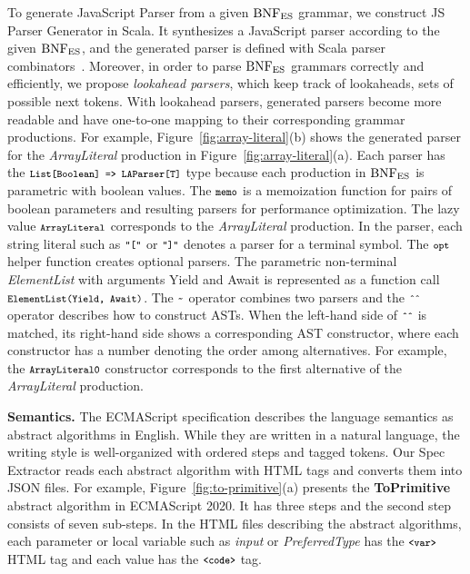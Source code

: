 To generate {\sf JavaScript Parser} from a given \( \text{BNF}_{\text{ES}} \) grammar, we
construct \textsf{JS Parser Generator} in Scala.  It synthesizes a
JavaScript parser according to the given \( \text{BNF}_{\text{ES}} \), and the
generated parser is defined with Scala parser combinators~\cite{scala-parser-combinators}.
Moreover, in order to parse \( \text{BNF}_{\text{ES}} \) grammars correctly and
efficiently, we propose \textit{lookahead parsers}, which keep track
of lookaheads, sets of possible next tokens.  With lookahead parsers,
generated parsers become more readable and have one-to-one
mapping to their corresponding grammar productions.
For example, Figure~\ref{fig:array-literal}(b) shows the generated
parser for the \textit{ArrayLiteral} production in Figure~\ref{fig:array-literal}(a).
Each parser has the \( \texttt{\footnotesize List[Boolean] => LAParser[T]} \) type
because  each production in \( \text{BNF}_{\text{ES}} \) is parametric with boolean values.
The \( \texttt{\footnotesize memo} \) is a memoization function for pairs of boolean
parameters and resulting parsers for performance optimization.
The lazy value \( \texttt{\footnotesize ArrayLiteral} \) corresponds to the
\textit{ArrayLiteral} production.  In the parser, each string literal
such as \( \texttt{\footnotesize"["} \) or \( \texttt{\footnotesize"]"} \) denotes a parser for a
terminal symbol.  The \( \texttt{\footnotesize opt} \) helper function creates
optional parsers.  The parametric non-terminal \textit{ElementList}
with arguments \textsf{Yield} and \textsf{Await} is represented as a
function call \( \texttt{\footnotesize ElementList(Yield, Await)} \).
The \( \texttt{\footnotesize\textasciitilde} \) operator combines two parsers
and the \( \texttt{\footnotesize\^{}\^{}} \) operator describes how to construct ASTs.
When the left-hand side of \( \texttt{\footnotesize\^{}\^{}} \) is matched, its
right-hand side shows a corresponding AST constructor, where each
constructor has a number denoting the order among alternatives.
For example, the \( \texttt{\footnotesize ArrayLiteral0} \) constructor corresponds to
the first alternative of the \textit{ArrayLiteral} production.

\smallskip

\textbf{Semantics.}
The ECMAScript specification describes the language semantics as
abstract algorithms in English.  While they are written in a natural
language, the writing style is well-organized with ordered steps and
tagged tokens.  Our {\sf Spec Extractor} reads each abstract algorithm
with HTML tags and converts them into JSON files.  For example,
Figure~\ref{fig:to-primitive}(a) presents the \textbf{ToPrimitive}
abstract algorithm in ECMAScript 2020.  It has three steps and the
second step consists of seven sub-steps.  In the HTML files describing
the abstract algorithms, each parameter or local variable such as
\textit{input} or \textit{PreferredType} has the \( \texttt{\footnotesize<var>} \)
HTML tag and each value has the \( \texttt{\footnotesize<code>} \) tag.

